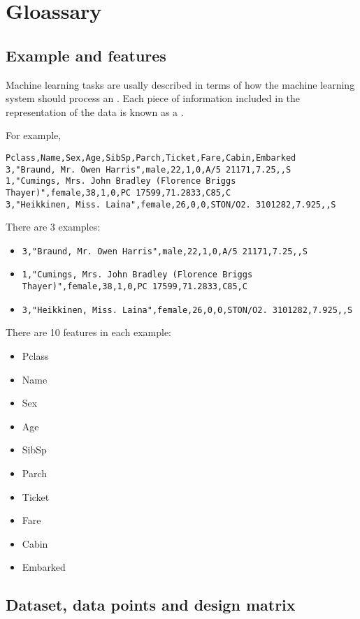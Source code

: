 
\chapter{Gloassary}


\section{Example and features}
Machine learning tasks are usally described in terms of how the machine learning system should process an .
Each piece of information included in the representation of the data is known as a .

For example,
\begin{verbatim}
Pclass,Name,Sex,Age,SibSp,Parch,Ticket,Fare,Cabin,Embarked
3,"Braund, Mr. Owen Harris",male,22,1,0,A/5 21171,7.25,,S
1,"Cumings, Mrs. John Bradley (Florence Briggs Thayer)",female,38,1,0,PC 17599,71.2833,C85,C
3,"Heikkinen, Miss. Laina",female,26,0,0,STON/O2. 3101282,7.925,,S
\end{verbatim}

There are 3 examples:
\begin{itemize}
\item \verb|3,"Braund, Mr. Owen Harris",male,22,1,0,A/5 21171,7.25,,S|
\item \verb|1,"Cumings, Mrs. John Bradley (Florence Briggs Thayer)",female,38,1,0,PC 17599,71.2833,C85,C|
\item \verb|3,"Heikkinen, Miss. Laina",female,26,0,0,STON/O2. 3101282,7.925,,S|
\end{itemize}

There are 10 features in each example:
\begin{itemize}
\item Pclass
\item Name
\item Sex
\item Age
\item SibSp
\item Parch
\item Ticket
\item Fare
\item Cabin
\item Embarked
\end{itemize}

\section{Dataset, data points and design matrix}

